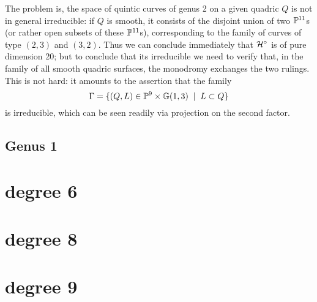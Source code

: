 The problem is, the space of quintic curves of genus 2 on a given quadric $Q$ is not in general irreducible: if $Q$ is smooth, it consists of the disjoint union of two $\PP^{11}$s (or rather open subsets of these $\PP^{11}$s), corresponding to the family of curves of type $(2,3)$ and $(3,2)$. Thus we can conclude immediately that $\cH^\circ$ is of pure dimension 20; but to conclude that its irreducible we need to verify that, in the family of all smooth quadric surfaces, the monodromy exchanges the two rulings. This is not hard: it amounts to the assertion that the family
$$
\Gamma = \{ (Q,L) \in \PP^9 \times \GG(1,3) \; \mid \; L \subset Q \}
$$
is irreducible, which can be seen readily via projection on the second factor.

\subsection{Genus 1}

\section{degree 6}
\section{degree 8}
\section{degree 9}


